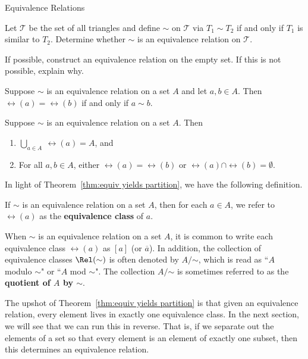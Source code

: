\begin{section}{Equivalence Relations}
\begin{problem}
Let $\mathcal{T}$ be the set of all triangles and define $\sim$ on $\mathcal{T}$ via $T_1\sim T_2$ if and only if $T_1$ is similar to $T_2$.  Determine whether $\sim$ is an equivalence relation on $\mathcal{T}$.
\end{problem}

\begin{problem}
If possible, construct an equivalence relation on the empty set.  If this is not possible, explain why.
\end{problem}

\begin{theorem}\label{thm:related if and only if same class}
Suppose $\sim$ is an equivalence relation on a set $A$ and let $a,b\in A$.  Then $\rel(a)=\rel(b)$ if and only if $a\sim b$.
\end{theorem}

\begin{theorem}\label{thm:equiv yields partition}
Suppose $\sim$ is an equivalence relation on a set $A$.  Then
\begin{enumerate}[label=\textrm{(\alph*)}]
\item $\displaystyle \bigcup_{a\in A}\ \rel(a)=A$, and
\item\label{thm:equiv yields partition b} For all $a,b\in A$, either $\rel(a)=\rel(b)$ or $\rel(a)\cap \rel(b)=\emptyset$.
\end{enumerate}
\end{theorem}

In light of Theorem~\ref{thm:equiv yields partition}, we have the following definition.

\begin{definition}\label{def:equivalence class}
If $\sim$ is an equivalence relation on a set $A$, then for each $a\in A$, we refer to $\rel(a)$ as the \textbf{equivalence class} of $a$.
\end{definition}

When $\sim$ is an equivalence relation on a set $A$, it is common to write each equivalence class $\rel(a)$ as $[a]$ (or $\overline{a}$). In addition, the collection of equivalence classes $\Rel(\sim)$ is often denoted by $A/\mathord\sim$, which is read as ``$A$ modulo $\sim$" or ``$A$ mod $\sim$".  The collection $A/\mathord\sim$ is sometimes referred to as the \textbf{quotient of $A$ by $\sim$}.

The upshot of Theorem~\ref{thm:equiv yields partition} is that given an equivalence relation, every element lives in exactly one equivalence class.  In the next section, we will see that we can run this in reverse.  That is, if we separate out the elements of a set so that every element is an element of exactly one subset, then this determines an equivalence relation.


\end{section}
